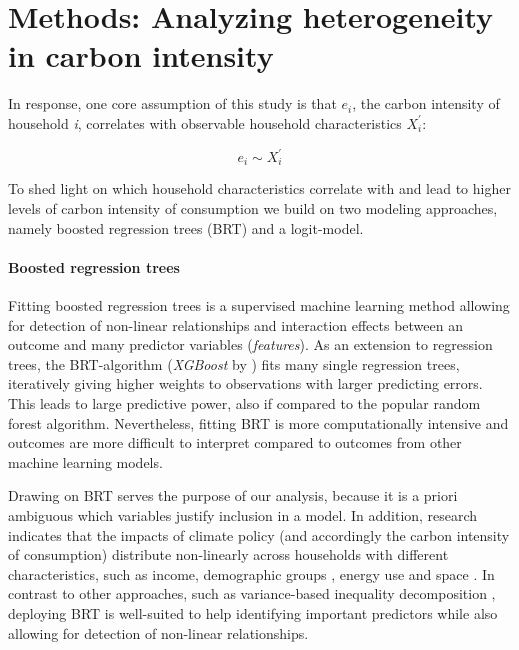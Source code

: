 \documentclass[12pt, a4paper]{article}
\begin{document}
\section{Methods: Analyzing heterogeneity in carbon intensity} \label{sec:methods}

In response, one core assumption of this study is that $e_{i}$, the carbon intensity of household \textit{i}, correlates with observable household characteristics $X_{i}^{'}$:

\begin{equation}
    e_{i} \sim X_{i}^{'}
\end{equation}


To shed light on which household characteristics correlate with and lead to higher levels of carbon intensity of consumption we build on two modeling approaches, namely boosted regression trees (BRT) and a logit-model.

\paragraph{Boosted regression trees} Fitting boosted regression trees \autocite{Friedman.2003, Elith.2008} is a supervised machine learning method allowing for detection of non-linear relationships and interaction effects between an outcome and many predictor variables (\textit{features}). As an extension to regression trees, the BRT-algorithm (\textit{XGBoost} by \textcite{Chen.2016}) fits many single regression trees, iteratively giving higher weights to observations with larger predicting errors. This leads to large predictive power, also if compared to the popular random forest algorithm. Nevertheless, fitting BRT is more computationally intensive and outcomes are more difficult to interpret compared to outcomes from other machine learning models. 

Drawing on BRT serves the purpose of our analysis, because it is a priori ambiguous which variables justify inclusion in a model. In addition, research indicates that the impacts of climate policy (and accordingly the carbon intensity of consumption) distribute non-linearly across households with different characteristics, such as income, demographic groups \autocite{Missbach.2023}, energy use \autocite{Farrell.2017} and space \autocite{Chan.2023}. In contrast to other approaches, such as variance-based inequality decomposition \autocite{Farrell.2017,Sager.2019b,Missbach.2024}, deploying BRT is well-suited to help identifying important predictors while also allowing for detection of non-linear relationships.
\end{document}
